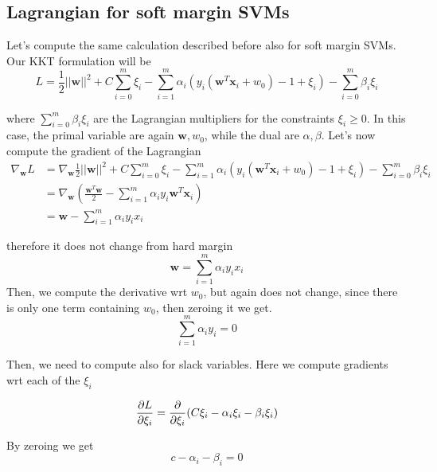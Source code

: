 \subsection{Lagrangian for soft margin SVMs}
Let's compute the same calculation described before also for soft margin SVMs. Our
KKT formulation will be
\[
	L = \frac{1}{2}||\pmb{w}||^{2}+ C \sum_{i=0}^{m}\xi_{i}- \sum_{i=1}^{m}\alpha_{i}
	(y_{i}(\pmb{w}^{T}\pmb{x}_{i}+ w_{0}) - 1 + \xi_{i}) -\sum_{i=0}^{m}\beta_{i}\xi
	_{i}
\]

where $\sum_{i=0}^{m}\beta_{i}\xi_{i}$ are the Lagrangian multipliers for the
constraints $\xi_{i}\geq 0$. In this case, the primal variable are again
$\pmb{w}, w_{0}$, while the dual are $\alpha, \beta$. Let's now compute the
gradient of the Lagrangian
\begin{align*}
	\nabla_{\pmb{w}}L & = \nabla_{\pmb{w}}{\frac{1}{2} ||\pmb{w}||^2 + C \sum_{i=0}^m \xi_i - \sum_{i=1}^m \alpha_i (y_i (\pmb{w}^T \pmb{x}_i + w_0) - 1 + \xi_i) -\sum_{i=0}^m \beta_i \xi_i} \\
	                  & = \nabla_{\pmb{w}}\left( \frac{\pmb{w}^{T}\pmb{w}}{2}- \sum_{i=1}^{m}\alpha_{i}y_{i}\pmb{w}^{T}\pmb{x}_{i}\right)                                                      \\
	                  & = \pmb{w}- \sum_{i=1}^{m}\alpha_{i}y_{i}x_{i}
\end{align*}

therefore it does not change from hard margin
\begin{equation}
	\pmb{w}= \sum_{i=1}^{m}\alpha_{i}y_{i}x_{i}\label{eq:soft_margin_w_result}
\end{equation}
Then, we compute the derivative wrt $w_{0}$, but again does not change, since
there is only one term containing $w_{0}$, then zeroing it we get.
\begin{equation}
	\sum_{i=1}^{m}\alpha_{i}y_{i}= 0 \label{eq:soft_margin_w_0_result}
\end{equation}

Then, we need to compute also for slack variables. Here we compute gradients wrt
each of the $\xi_{i}$

\[
	\pdv{L}{\xi_i}= \pdv{}{\xi_i}(C\xi_{i}- \alpha_{i}\xi_{i}- \beta_{i}\xi_{i})
\]

By zeroing we get
\begin{equation}
	c - \alpha_{i}- \beta_{i}= 0 \label{eq:soft_margin_xi_gradient}
\end{equation}

